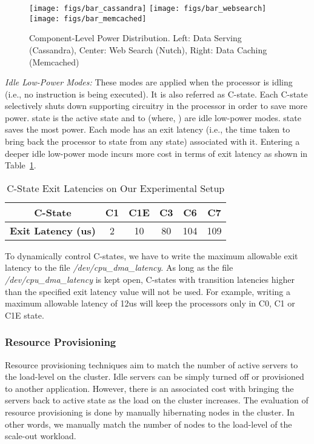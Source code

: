 \documentclass{sig-alternate}
\begin{document}
\begin{figure*}[t]
\centering
\texttt{[image: figs/bar\_cassandra]}
\texttt{[image: figs/bar\_websearch]}
\texttt{[image: figs/bar\_memcached]}
\caption{Component-Level Power Distribution. Left: Data Serving (Cassandra), Center: 
Web Search (Nutch), Right: Data Caching (Memcached)}
\label{fig:pdis}
\end{figure*}

\emph{Idle Low-Power Modes:} These modes are applied when the processor is idling 
(i.e., no instruction is being executed). It is also referred as C-state. Each C-state 
selectively shuts down supporting circuitry in the processor in order to save more 
power.  state is the active state and  to  (where, ) 
are idle low-power modes.  state saves the most power. Each mode has an exit latency 
(i.e., the time taken to bring back the processor to  state from any  state) 
associated with it. Entering a deeper idle low-power mode incurs more cost in 
terms of exit latency as shown in Table~\ref{tab:cstatelat}.

\begin{table}[htb]
\centering
\caption{C-State Exit Latencies on Our Experimental Setup}
\label{tab:cstatelat}
\begin{tabular}{|c|c|c|c|c|c|} 
\hline
\textbf{C-State} & C1 & C1E & C3 & C6 & C7 \\ \hline
\textbf{Exit Latency (us)} &	2 & 10 & 80 & 104 & 109 \\ \hline
\end{tabular}
\end{table}  

To dynamically control C-states, we have to write the maximum allowable exit latency to the 
file \emph{/dev/cpu\_dma\_latency}. As long as the file \emph{/dev/cpu\_dma\_latency} is kept open, 
C-states with transition latencies higher than the specified exit latency value will not be used. 
For example, writing a maximum allowable latency of 12us will keep the processors only in C0, C1 or C1E 
state.  


\subsubsection{Resource Provisioning}

Resource provisioning techniques aim to match the number of active servers 
to the load-level on the cluster. Idle servers can be simply turned off or 
provisioned to another application. However, there is an associated cost 
with bringing the servers back to active state as the load on the cluster increases. 
The evaluation of resource provisioning is done by manually hibernating nodes
in the cluster. In other words, we manually match the number of nodes to the load-level of the 
scale-out workload. 
\end{document}
